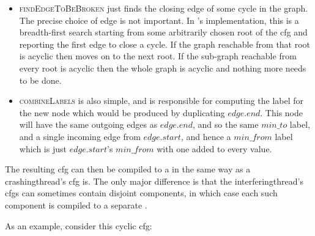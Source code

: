 \begin{itemize}
\item \textsc{findEdgeToBeBroken} just finds the closing edge of some
  cycle in the graph.  The precise choice of edge is not
  important.  In {\implementation}'s implementation, this is a
  breadth-first search starting from some arbitrarily chosen root of
  the \gls{cfg} and reporting the first edge to close a cycle.  If the graph
  reachable from that root is acyclic then {\implementation} moves on
  to the next root.  If the sub-graph reachable from every root is
  acyclic then the whole graph is acyclic and nothing more needs to be
  done.
\item \textsc{combineLabels} is also simple, and is responsible for
  computing the label for the new node which would be produced by
  duplicating $\mathit{edge}.\mathit{end}$.  This node will have the
  same outgoing edges as $\mathit{edge}.\mathit{end}$, and so the same
  $min\_to$ label, and a single incoming edge from
  $\mathit{edge}.\mathit{start}$, and hence a $\mathit{min\_from}$
  label which is just $\mathit{edge}.\mathit{start}$'s
  $\mathit{min\_from}$ with one added to every value.
\end{itemize}

The resulting \gls{cfg} can then be compiled to a {\StateMachine} in
the same way as a \gls{crashingthread}'s \gls{cfg} is.  The only major
difference is that the \gls{interferingthread}'s \glspl{cfg} can
sometimes contain disjoint components, in which case each such
component is compiled to a separate {\StateMachine}.

As an example, consider this cyclic \gls{cfg}:


